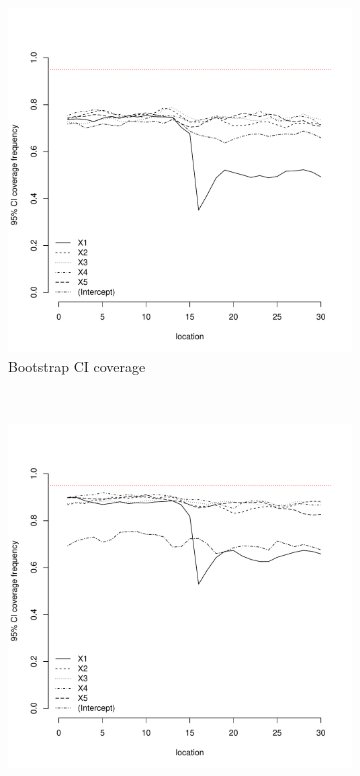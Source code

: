 \documentclass[authoryear, review, 11pt]{elsarticle}
\begin{document}
\begin{figure}
	\vspace{-30mm}
	\centering
	\begin{subfigure}[b]{0.45\textwidth}
	\centering
		\includegraphics[width=\textwidth]{../../figures/simulation/15.27.profile_bootstrap_coverage.pdf}
		\caption{Bootstrap CI coverage}
	\end{subfigure}%
	~ %
	\begin{subfigure}[b]{0.45\textwidth}
	\centering
		\includegraphics[width=\textwidth]{../../figures/simulation/15.27.profile_se_coverage.pdf}

\end{subfigure}
\end{figure}
\end{document}
